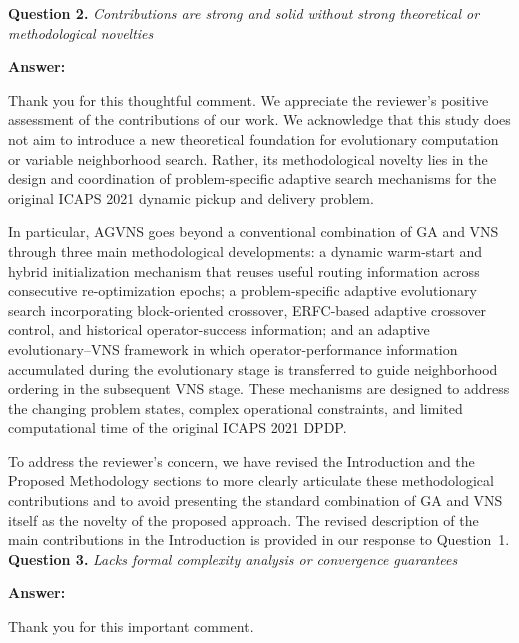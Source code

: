 \documentclass[11pt]{article}
\newcommand{\question}[2]{\vspace{0.5em}\noindent\textbf{Question #1.} \emph{#2}\par}
\newcommand{\answer}{\noindent\textbf{Answer:}\par}
\begin{document}
\question{2}{Contributions are strong and solid without strong theoretical or methodological novelties}
\answer
Thank you for this thoughtful comment. We appreciate the reviewer's positive assessment of the contributions of our work. We acknowledge that this study does not aim to introduce a new theoretical foundation for evolutionary computation or variable neighborhood search. Rather, its methodological novelty lies in the design and coordination of 
problem-specific adaptive search mechanisms for the original ICAPS 2021 dynamic pickup and delivery problem.

In particular, AGVNS goes beyond a conventional combination of GA and VNS through three main methodological developments: a dynamic warm-start and hybrid initialization mechanism that reuses useful routing information across consecutive re-optimization epochs; a problem-specific adaptive 
evolutionary search incorporating block-oriented crossover, ERFC-based adaptive crossover control, and historical operator-success information; and an adaptive evolutionary--VNS framework in which operator-performance 
information accumulated during the evolutionary stage is transferred to guide neighborhood ordering in the subsequent VNS stage. These mechanisms are designed to address the changing problem states, complex operational 
constraints, and limited computational time of the original ICAPS 2021 DPDP.

To address the reviewer's concern, we have revised the Introduction and the Proposed Methodology sections to more clearly articulate these methodological contributions and to avoid presenting the standard combination of GA and VNS itself as the novelty of the proposed approach. 
The revised description of the main contributions in the Introduction is provided in our response to Question~1.
\question{3}{Lacks formal complexity analysis or convergence guarantees}
\answer
Thank you for this important comment. 
\end{document}
